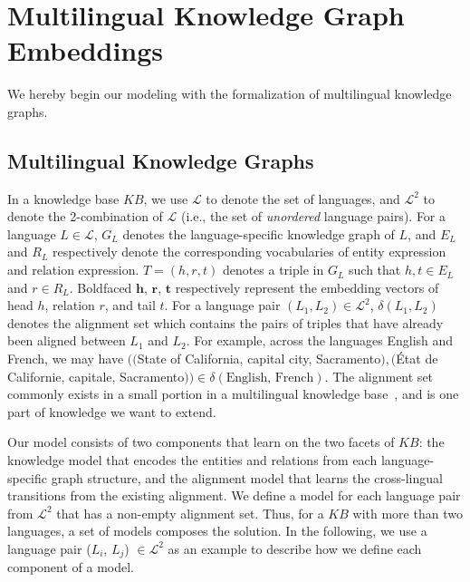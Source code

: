 \documentclass{article}
\def\inv{\vspace{-0.1cm}}
\begin{document}
\def\kb{\mathit{KB}}
\def\language{\mathcal{L}}
\def\bhline{\specialrule{.2em}{0em}{0em}}
\newcommand{\bigO}[1]{{\rm O} (#1)\xspace}

\inv
\section{Multilingual Knowledge Graph Embeddings}

We hereby begin our modeling with the formalization of multilingual knowledge graphs.

\inv
\subsection{Multilingual Knowledge Graphs}

In a knowledge base $\kb$, we use $\language$ to denote the set of languages, and $\language^2$ to denote the 2-combination of $\language$ (i.e., the set of \emph{unordered} language pairs). For a language $L \in \language$, $G_{L}$ denotes the language-specific knowledge graph of $L$, and $E_{L}$ and $R_{L}$ respectively denote the corresponding vocabularies of entity expression and relation expression.
$T = (h,r,t)$ denotes a triple in $G_{L}$ such that $h, t \in E_{L}$ and $r \in R_{L}$. Boldfaced $\mathbf{h}$, $\mathbf{r}$, $\mathbf{t}$ respectively represent the embedding vectors of head $h$, relation $r$, and tail $t$. For a language pair $(L_1, L_2) \in \language^2$, $\delta(L_1, L_2)$ denotes the alignment set which contains
the pairs of triples that have already been aligned
between $L_1$ and $L_2$.
For example, across the languages English and French, we may have $\bigl(($State of California, capital city, Sacramento$), ($\'{E}tat de Californie, capitale, Sacramento$)\bigr) \in \delta(\mbox{English, French})$.
The alignment set commonly exists in a small portion in a multilingual knowledge base~\cite{vrandevcic2012wikidata,mahdisoltani2014yago3,lehmann2015dbpedia}, and is one part of knowledge we want to extend.
\par



Our model consists of two components that learn on the two facets of $\kb$: the knowledge model that encodes the entities and relations from each language-specific graph structure, and the alignment model that learns the cross-lingual transitions from the existing alignment. We define a model for each language pair from $\language^2$ that has a non-empty alignment set. Thus, for a $\kb$ with more than two languages, a set of models composes the solution. In the following, we use a language pair ($L_i$, $L_j$) $\in \language^2$ as an example to describe how we define each component of a model.
\par
\end{document}
